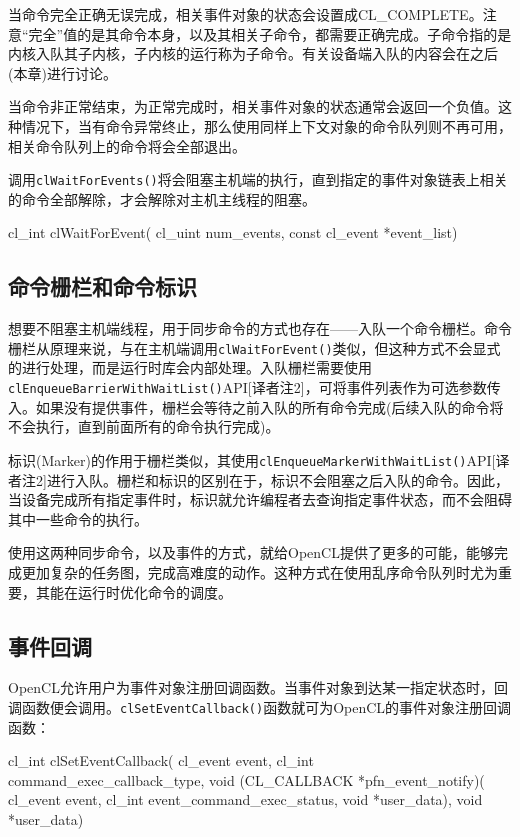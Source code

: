 当命令完全正确无误完成，相关事件对象的状态会设置成CL\_\allowbreak{}COMPLETE。注意“完全”值的是其命令本身，以及其相关子命令，都需要正确完成。子命令指的是内核入队其子内核，子内核的运行称为子命令。有关设备端入队的内容会在之后(本章)进行讨论。

当命令非正常结束，为正常完成时，相关事件对象的状态通常会返回一个负值。这种情况下，当有命令异常终止，那么使用同样上下文对象的命令队列则不再可用，相关命令队列上的命令将会全部退出。

调用\texttt{clWaitForEvents()}将会阻塞主机端的执行，直到指定的事件对象链表上相关的命令全部解除，才会解除对主机主线程的阻塞。

\begin{codebox}[cpp]
cl_int
clWaitForEvent(
  cl_uint num_events,
  const cl_event *event_list)
\end{codebox}

\subsection{命令栅栏和命令标识}

想要不阻塞主机端线程，用于同步命令的方式也存在——入队一个命令栅栏。命令栅栏从原理来说，与在主机端调用\texttt{clWaitForEvent()}类似，但这种方式不会显式的进行处理，而是运行时库会内部处理。入队栅栏需要使用\texttt{clEnqueueBarrierWithWaitList()}API[译者注2]，可将事件列表作为可选参数传入。如果没有提供事件，栅栏会等待之前入队的所有命令完成(后续入队的命令将不会执行，直到前面所有的命令执行完成)。

标识(Marker)的作用于栅栏类似，其使用\texttt{clEnqueueMarkerWithWaitList()}API[译者注2]进行入队。栅栏和标识的区别在于，标识不会阻塞之后入队的命令。因此，当设备完成所有指定事件时，标识就允许编程者去查询指定事件状态，而不会阻碍其中一些命令的执行。

使用这两种同步命令，以及事件的方式，就给OpenCL提供了更多的可能，能够完成更加复杂的任务图，完成高难度的动作。这种方式在使用乱序命令队列时尤为重要，其能在运行时优化命令的调度。

\subsection{事件回调}

OpenCL允许用户为事件对象注册回调函数。当事件对象到达某一指定状态时，回调函数便会调用。\texttt{clSetEventCallback()}函数就可为OpenCL的事件对象注册回调函数：

\begin{codebox}[cpp]
cl_int
clSetEventCallback(
  cl_event event,
  cl_int command_exec_callback_type,
  void (CL_CALLBACK *pfn_event_notify)(
    cl_event event,
    cl_int event_command_exec_status,
    void *user_data),
  void *user_data)
\end{codebox}

